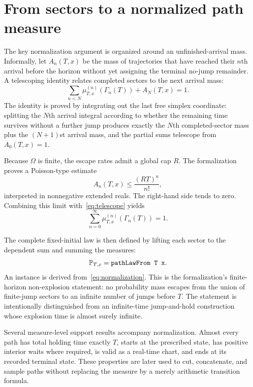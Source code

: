 \section{From sectors to a normalized path measure}
\label{sec:normalization}

The key normalization argument is organized around an unfinished-arrival mass. Informally, let $A_n(T,x)$ be the mass of trajectories that have reached their $n$th arrival before the horizon without yet assigning the terminal no-jump remainder. A telescoping identity relates completed sectors to the next arrival mass:
\begin{equation}
\label{eq:telescope}
  \sum_{n<N} \mu^{(n)}_{T,x}(\Gamma_n(T)) + A_N(T,x)=1.
\end{equation}
The identity is proved by integrating out the last free simplex coordinate: splitting the $N$th arrival integral according to whether the remaining time survives without a further jump produces exactly the $N$th completed-sector mass plus the $(N{+}1)$st arrival mass, and the partial sums telescope from $A_0(T,x)=1$.

Because $\Omega$ is finite, the escape rates admit a global cap $R$. The formalization proves a Poisson-type estimate
\begin{equation}
\label{eq:arrival-bound}
  A_n(T,x)\le \frac{(RT)^n}{n!},
\end{equation}
interpreted in nonnegative extended reals. The right-hand side tends to zero. Combining this limit with~\eqref{eq:telescope} yields
\begin{equation}
\label{eq:normalization}
  \sum_{n=0}^{\infty}\mu^{(n)}_{T,x}(\Gamma_n(T))=1.
\end{equation}

The complete fixed-initial law is then defined by lifting each sector to the dependent sum and summing the measures:
\[
  \Pp_{T,x}=\lean{pathLawFrom T x}.
\]
An  instance is derived from~\eqref{eq:normalization}. This is the formalization's finite-horizon non-explosion statement: no probability mass escapes from the union of finite-jump sectors to an infinite number of jumps before $T$. The statement is intentionally distinguished from an infinite-time jump-and-hold construction whose explosion time is almost surely infinite.

Several measure-level support results accompany normalization. Almost every path has total holding time exactly $T$, starts at the prescribed state, has positive interior waits where required, is valid as a real-time chart, and ends at its recorded terminal state. These properties are later used to cut, concatenate, and sample paths without replacing the measure by a merely arithmetic transition formula.


